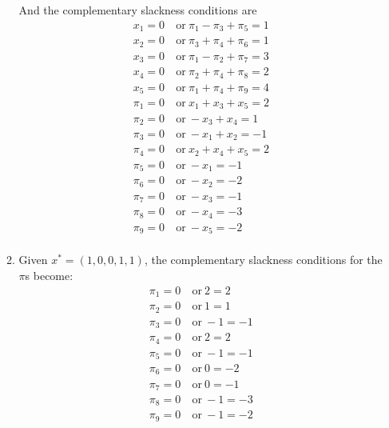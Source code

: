 \documentclass[12pt]{article}
\begin{document}
\begin{enumerate}
\begin{enumerate}
        And the complementary slackness conditions are
        \begin{equation}
          \begin{split}
            x_1=0&\ \text{or}\ \pi_1-\pi_3+\pi_5=1\\
            x_2=0&\ \text{or}\ \pi_3+\pi_4+\pi_6=1\\
            x_3=0&\ \text{or}\ \pi_1-\pi_2+\pi_7=3\\
            x_4=0&\ \text{or}\ \pi_2+\pi_4+\pi_8=2\\
            x_5=0&\ \text{or}\ \pi_1+\pi_4+\pi_9=4\\
            \pi_1=0&\ \text{or}\ x_1+x_3+x_5=2\\
            \pi_2=0&\ \text{or}\ -x_3+x_4=1\\
            \pi_3=0&\ \text{or}\ -x_1+x_2=-1\\
            \pi_4=0&\ \text{or}\ x_2+x_4+x_5=2\\
            \pi_5=0&\ \text{or}\ -x_1=-1\\
            \pi_6=0&\ \text{or}\ -x_2=-2\\
            \pi_7=0&\ \text{or}\ -x_3=-1\\
            \pi_8=0&\ \text{or}\ -x_4=-3\\
            \pi_9=0&\ \text{or}\ -x_5=-2\\
          \end{split}
        \end{equation}
      \item
        Given $x^* = (1,0,0,1,1)$, the complementary slackness conditions
        for the $\pi$s become:
        \begin{equation}
          \begin{split}
            \pi_1=0&\ \text{or}\ 2=2\\
            \pi_2=0&\ \text{or}\ 1=1\\
            \pi_3=0&\ \text{or}\ -1=-1\\
            \pi_4=0&\ \text{or}\ 2=2\\
            \pi_5=0&\ \text{or}\ -1=-1\\
            \pi_6=0&\ \text{or}\ 0=-2\\
            \pi_7=0&\ \text{or}\ 0=-1\\
            \pi_8=0&\ \text{or}\ -1=-3\\
            \pi_9=0&\ \text{or}\ -1=-2\\
          \end{split}

\end{equation}
\end{enumerate}
\end{enumerate}
\end{document}
